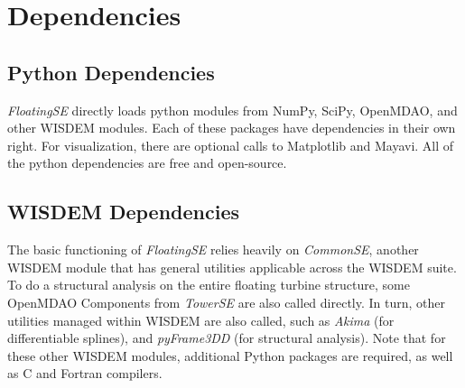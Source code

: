 \section{Dependencies}
\subsection{Python Dependencies}
\textit{FloatingSE} directly loads python modules from NumPy, SciPy,
OpenMDAO, and other WISDEM modules.  Each of these packages have
dependencies in their own right.  For visualization, there are optional
calls to Matplotlib and Mayavi.  All of the python dependencies are free
and open-source.

\subsection{WISDEM Dependencies}
The basic functioning of \textit{FloatingSE} relies heavily on \textit{CommonSE}, another
WISDEM module that has general utilities applicable across the WISDEM
suite.  To do a structural analysis on the entire floating turbine
structure, some OpenMDAO Components from \textit{TowerSE} are also called
directly.  In turn, other utilities managed within WISDEM are also
called, such as \textit{Akima} (for differentiable splines), and \textit{pyFrame3DD} (for
structural analysis).  Note that for these other WISDEM modules,
additional Python packages are required, as well as C and Fortran compilers.
